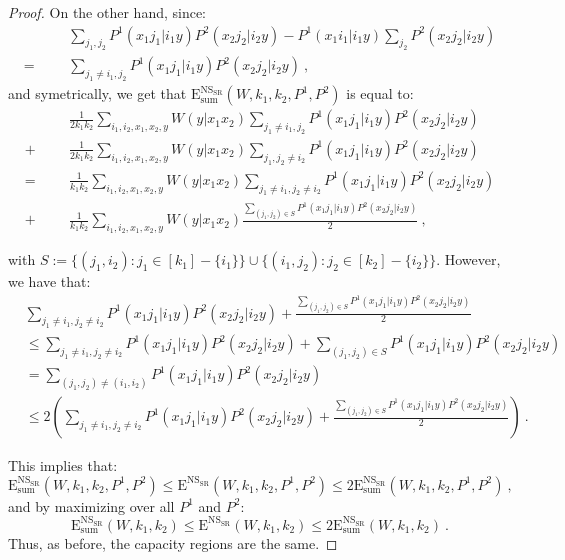 \begin{proof}
On the other hand, since:
\begin{equation}
  \begin{aligned}
    &&&\sum_{j_1,j_2}P^1(x_1j_1|i_1y)P^2(x_2j_2|i_2y) - P^1(x_1i_1|i_1y)\sum_{j_2}P^2(x_2j_2|i_2y)\\
    = &&&\sum_{j_1\not=i_1,j_2}P^1(x_1j_1|i_1y)P^2(x_2j_2|i_2y) \ ,
  \end{aligned}
\end{equation}
and symetrically, we get that $\mathrm{E}_{\text{sum}}^{\mathrm{NS}_{\mathrm{SR}}}(W,k_1,k_2,P^1,P^2)$ is equal to:
\begin{equation}
  \begin{aligned}
    &&&\frac{1}{2k_1k_2}\sum_{i_1,i_2,x_1,x_2,y} W(y|x_1x_2)\sum_{j_1\not=i_1,j_2}P^1(x_1j_1|i_1y)P^2(x_2j_2|i_2y)\\
    + &&& \frac{1}{2k_1k_2}\sum_{i_1,i_2,x_1,x_2,y} W(y|x_1x_2)\sum_{j_1,j_2\not=i_2}P^1(x_1j_1|i_1y)P^2(x_2j_2|i_2y)\\
    = &&&\frac{1}{k_1k_2}\sum_{i_1,i_2,x_1,x_2,y} W(y|x_1x_2)\sum_{j_1\not=i_1,j_2\not=i_2}P^1(x_1j_1|i_1y)P^2(x_2j_2|i_2y)\\
    + &&& \frac{1}{k_1k_2}\sum_{i_1,i_2,x_1,x_2,y} W(y|x_1x_2)\frac{\sum_{(j_1,j_2) \in S}P^1(x_1j_1|i_1y)P^2(x_2j_2|i_2y)}{2} \ ,
  \end{aligned}
\end{equation}

with $S := \{(j_1,i_2) : j_1 \in [k_1]-\{i_1\}\} \cup \{(i_1,j_2) : j_2 \in [k_2]-\{i_2\}\}$. However, we have that:
\begin{equation}
  \begin{aligned}
    &\sum_{j_1\not=i_1,j_2\not=i_2}P^1(x_1j_1|i_1y)P^2(x_2j_2|i_2y) + \frac{\sum_{(j_1,j_2) \in S}P^1(x_1j_1|i_1y)P^2(x_2j_2|i_2y)}{2}\\
    &\leq \sum_{j_1\not=i_1,j_2\not=i_2}P^1(x_1j_1|i_1y)P^2(x_2j_2|i_2y) + \sum_{(j_1,j_2) \in S}P^1(x_1j_1|i_1y)P^2(x_2j_2|i_2y)\\
    &= \sum_{(j_1,j_2) \not= (i_1,i_2)}P^1(x_1j_1|i_1y)P^2(x_2j_2|i_2y)\\
    &\leq 2\left(\sum_{j_1\not=i_1,j_2\not=i_2}P^1(x_1j_1|i_1y)P^2(x_2j_2|i_2y) + \frac{\sum_{(j_1,j_2) \in S}P^1(x_1j_1|i_1y)P^2(x_2j_2|i_2y)}{2}\right) \ .
  \end{aligned}
\end{equation}

This implies that:
\[\mathrm{E}_{\text{sum}}^{\mathrm{NS}_{\mathrm{SR}}}(W,k_1,k_2,P^1,P^2) \leq \mathrm{E}^{\mathrm{NS}_{\mathrm{SR}}}(W,k_1,k_2,P^1,P^2) \leq 2\mathrm{E}_{\text{sum}}^{\mathrm{NS}_{\mathrm{SR}}}(W,k_1,k_2,P^1,P^2) \ ,\]
and by maximizing over all $P^1$ and $P^2$:
\[\mathrm{E}_{\text{sum}}^{\mathrm{NS}_{\mathrm{SR}}}(W,k_1,k_2) \leq \mathrm{E}^{\mathrm{NS}_{\mathrm{SR}}}(W,k_1,k_2) \leq 2\mathrm{E}_{\text{sum}}^{\mathrm{NS}_{\mathrm{SR}}}(W,k_1,k_2) \ .\]
Thus, as before, the capacity regions are the same.
\end{proof}

